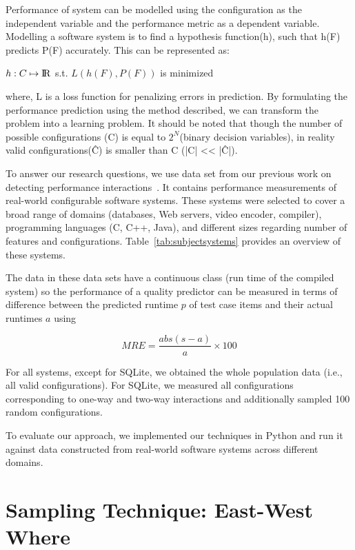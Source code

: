 \documentclass{sig-alternative}
\begin{document}
    Performance of system can be modelled using the configuration as the independent variable and the performance metric as a dependent variable. 
    Modelling a software system is to find a hypothesis function(h), such that h(F) predicts P(F) accurately. This can be represented as:\\
\begin{center}
    $ h: C \mapsto \rm I\!R$ s.t. $L(h(F), P(F))$ is minimized\\
\end{center}

where, L is a loss function for penalizing errors in prediction. By formulating the performance prediction using the method described, we can transform the problem into a learning problem. 
    It should be noted that though the number of possible configurations (C) is equal to $2^N$(binary decision variables), in reality valid configurations(\^{C}) is smaller than C (|C| << |\^C|). 


To answer our research questions, we use data set from our previous work on detecting performance interactions~\cite{SKR+12}. It contains performance measurements of real-world configurable software systems.
These systems were selected to cover a broad range of domains (databases, Web servers, video encoder, compiler), programming languages (C, C++, Java), and different sizes regarding number of features and configurations. Table~\ref{tab:subjectsystems} provides an overview of these systems.
 
 
The data in these
data sets have a continuous class (run time of the compiled system)
so the performance of a quality predictor can be measured in terms
of difference between the predicted runtime $p$ of test case items
and their actual runtimes $a$ using 

\begin{equation}\label{eq:1}
MRE = \frac{abs(s-a)}{a} \times 100
\end{equation}


For all systems, except for SQLite, we obtained the whole population data (i.e., all valid configurations). For SQLite, we measured all configurations corresponding to one-way and two-way interactions and additionally sampled 100 random configurations.

To evaluate our approach, we  implemented our techniques in Python and run it against data constructed from real-world software systems across different domains. 

\section{Sampling Technique: East-West Where}
\end{document}
